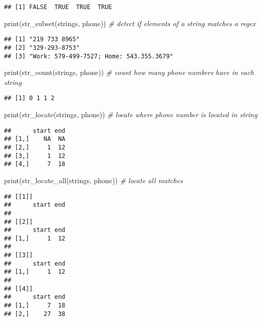 \documentclass[
]{article}
\newenvironment{Shaded}{\begin{snugshade}}{\end{snugshade}}
\newcommand{\CommentTok}[1]{\textcolor[rgb]{0.56,0.35,0.01}{\textit{#1}}}
\newcommand{\FunctionTok}[1]{\textcolor[rgb]{0.00,0.00,0.00}{#1}}
\newcommand{\NormalTok}[1]{#1}
\begin{document}
\begin{verbatim}
## [1] FALSE  TRUE  TRUE  TRUE
\end{verbatim}

\begin{Shaded}
\begin{Highlighting}[]
\FunctionTok{print}\NormalTok{(}\FunctionTok{str\_subset}\NormalTok{(strings, phone)) }\CommentTok{\# detect if elements of a string matches a regex}
\end{Highlighting}
\end{Shaded}

\begin{verbatim}
## [1] "219 733 8965"                          
## [2] "329-293-8753"                          
## [3] "Work: 579-499-7527; Home: 543.355.3679"
\end{verbatim}

\begin{Shaded}
\begin{Highlighting}[]
\FunctionTok{print}\NormalTok{(}\FunctionTok{str\_count}\NormalTok{(strings, phone)) }\CommentTok{\# count how many phone numbers have in each string}
\end{Highlighting}
\end{Shaded}

\begin{verbatim}
## [1] 0 1 1 2
\end{verbatim}

\begin{Shaded}
\begin{Highlighting}[]
\FunctionTok{print}\NormalTok{(}\FunctionTok{str\_locate}\NormalTok{(strings, phone)) }\CommentTok{\# locate where phone number is located in string}
\end{Highlighting}
\end{Shaded}

\begin{verbatim}
##      start end
## [1,]    NA  NA
## [2,]     1  12
## [3,]     1  12
## [4,]     7  18
\end{verbatim}

\begin{Shaded}
\begin{Highlighting}[]
\FunctionTok{print}\NormalTok{(}\FunctionTok{str\_locate\_all}\NormalTok{(strings, phone)) }\CommentTok{\# locate all matches}
\end{Highlighting}
\end{Shaded}

\begin{verbatim}
## [[1]]
##      start end
## 
## [[2]]
##      start end
## [1,]     1  12
## 
## [[3]]
##      start end
## [1,]     1  12
## 
## [[4]]
##      start end
## [1,]     7  18
## [2,]    27  38
\end{verbatim}
\end{document}
